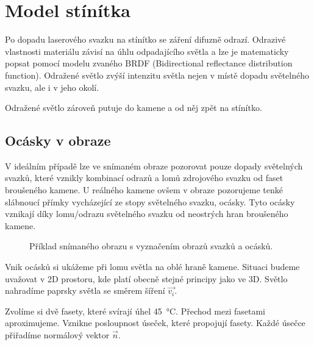 \section{Model stínítka}
\label{sec:stinitko}
Po dopadu laserového svazku na stínítko se záření difuzně odrazí. Odrazivé vlastnosti materiálu závisí na úhlu odpadajícího světla a lze je matematicky popsat pomocí modelu zvaného BRDF (Bidirectional reflectance distribution function). Odražené světlo zvýší intenzitu světla nejen v místě dopadu světelného svazku, ale i v jeho okolí.

Odražené světlo zároveň putuje do kamene a od něj zpět na stínítko. 



\subsection{Ocásky v obraze}
V ideálním případě lze ve snímaném obraze pozorovat pouze dopady světelných svazků, které vznikly kombinací odrazů a lomů zdrojového svazku od faset broušeného kamene. U reálného kamene ovšem v obraze pozorujeme tenké slábnoucí přímky vycházející ze stopy světelného svazku, ocásky. Tyto ocásky vznikají díky lomu/odrazu světelného svazku od neostrých hran broušeného kamene.

\begin{figure}[h!]
\begin{center}
\scalebox{.9}{ }
\end{center}
\caption{Příklad snímaného obrazu s vyznačením obrazů svazků a ocásků.}
\label{fig:tail_ex1}
\end{figure}


Vnik ocásků si ukážeme při lomu světla na oblé hraně kamene. Situaci budeme uvažovat v 2D prostoru, kde platí obecně stejné principy jako ve 3D. Světlo nahradíme paprsky světla se směrem šíření $\vec{v_i}$. 

Zvolíme si dvě fasety, které svírají úhel \SI{45}{\celsius}. Přechod mezi fasetami aproximujeme. Vznikne posloupnost úseček, které propojují fasety. Každé úsečce přiřadíme normálový vektor $\vec{n}$.  

